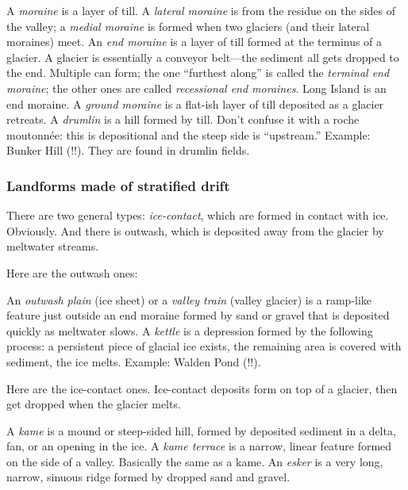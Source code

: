 \documentclass[11pt]{scrartcl}
\begin{document}
\begin{itemize}
	\ii A \emph{moraine} is a layer of till. A \emph{lateral moraine} is from the residue on the sides of the valley; a \emph{medial moraine} is formed when two glaciers (and their lateral moraines) meet.
	\ii An \emph{end moraine} is a layer of till formed at the terminus of a glacier. A glacier is essentially a conveyor belt---the sediment all gets dropped to the end. Multiple can form; the one ``furthest along'' is called the \emph{terminal end moraine}; the other ones are called \emph{recessional end moraines}. Long Island is an end moraine.
	\ii A \emph{ground moraine} is a flat-ish layer of till deposited as a glacier retreats.
	\ii A \emph{drumlin} is a hill formed by till. Don't confuse it with a roche moutonn\'ee: this is depositional and the steep side is ``upstream.'' Example: Bunker Hill (!!). They are found in drumlin fields.
\end{itemize}

\subsubsection{Landforms made of stratified drift}

There are two general types: \emph{ice-contact}, which are formed in contact with ice. Obviously. And there is outwash, which is deposited away from the glacier by meltwater streams.

Here are the outwash ones:

\begin{itemize}
	\ii An \emph{outwash plain} (ice sheet) or a \emph{valley train} (valley glacier) is a ramp-like feature just outside an end moraine formed by sand or gravel that is deposited quickly as meltwater slows.
	\ii A \emph{kettle} is a depression formed by the following process: a persistent piece of glacial ice exists, the remaining area is covered with sediment, the ice melts. Example: Walden Pond (!!).
\end{itemize}

Here are the ice-contact ones. Ice-contact deposits form on top of a glacier, then get dropped when the glacier melts.
\begin{itemize}
	\ii A \emph{kame} is a mound or steep-sided hill, formed by deposited sediment in a delta, fan, or an opening in the ice.
	\ii A \emph{kame terrace} is a narrow, linear feature formed on the side of a valley. Basically the same as a kame.
	\ii An \emph{esker} is a very long, narrow, sinuous ridge formed by dropped sand and gravel.
\end{itemize}
\end{document}
